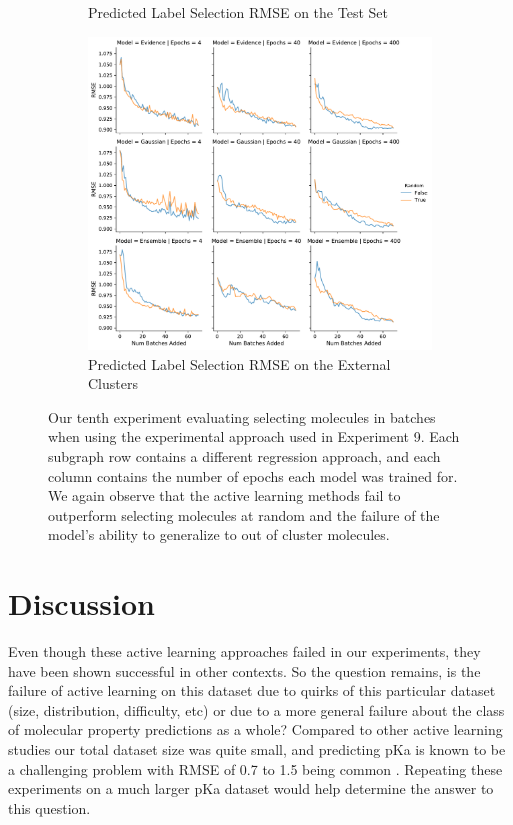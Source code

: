 \documentclass[journal=jmcmar,manuscript=article]{achemso}
\begin{document}
\begin{figure}[tbph]
\begin{subfigure}[b]{0.48\textwidth}
        \caption{Predicted Label Selection RMSE on the Test Set}
    \end{subfigure}%
    \hfill
    \begin{subfigure}[b]{0.48\textwidth}
        \includegraphics[width=1\linewidth]{figures/fig10_morgan_bylabel_molbatch_rest_RMSE.pdf}
        \caption{Predicted Label Selection RMSE on the External Clusters}
    \end{subfigure}
    \caption{Our tenth experiment evaluating selecting molecules in batches when using the experimental approach used in Experiment 9. Each subgraph row contains a different regression approach, and each column contains the number of epochs each model was trained for. We again observe that the active learning methods fail to outperform selecting molecules at random and the failure of the model's ability to generalize to out of cluster molecules.}
    \label{fig:batchingB}
\end{figure}


\section{Discussion}

Even though these active learning approaches failed in our experiments, they have been shown successful in other contexts. So the question remains, is the failure of active learning on this dataset due to quirks of this particular dataset (size, distribution, difficulty, etc) or due to a more general failure about the class of molecular property predictions as a whole? Compared to other active learning studies our total dataset size was quite small, and predicting pKa is known to be a challenging problem with RMSE of 0.7 to 1.5 being common \cite{operapKa,pkahard}. Repeating these experiments on a much larger pKa dataset would help determine the answer to this question.
\end{document}

